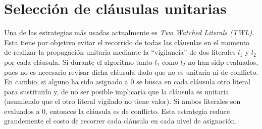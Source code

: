 \section{Selección de cláusulas unitarias}

Una de las estrategias más usadas actualmente es \textit{Two Watched Literals (TWL)}. Esta tiene por objetivo evitar el recorrido de todas las cláusulas en el momento de realizar la propagación unitaria mediante la ``vigilancia'' de dos literales $l_1$ y $l_2$ por cada cláusula. Si durante el algoritmo tanto $l_1$ como $l_2$ no han sidp evaluados, pues no es necesario revisar dicha cláusula dado que no es unitaria ni de conflicto. En cambio, si alguno ha sido asignado a 0 se busca en cada cláusula otro literal para sustituirlo y, de no ser posible implicaría que la cláusula es unitaria (asumiendo que el otro literal vigilado no tiene valor). Si ambos literales son evaluados a 0, entonces la cláusula es de conflicto. Esta estrategia reduce grandemente el costo de recorrer cada cláusula en cada nivel de asignación.

